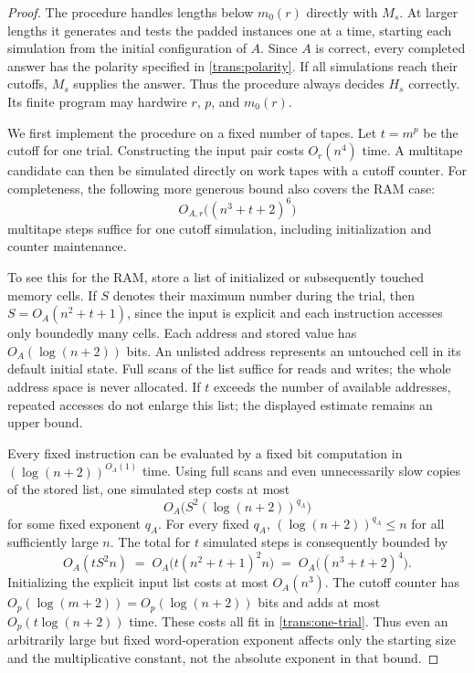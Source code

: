 \begin{proof}
The procedure handles lengths below $m_0(r)$ directly with $M_s$. At larger
lengths it generates and tests the padded instances one at a time, starting
each simulation from the initial configuration of $A$. Since $A$ is correct,
every completed answer has the polarity specified in
\eqref{trans:polarity}. If all simulations reach their cutoffs, $M_s$
supplies the answer. Thus the procedure always decides $H_s$ correctly.
Its finite program may hardwire $r$, $p$, and $m_0(r)$.

We first implement the procedure on a fixed number of tapes. Let $t=m^p$
be the cutoff for one trial. Constructing the input pair costs $O_r(n^4)$
time. A multitape candidate can then be simulated directly on work tapes
with a cutoff counter. For completeness, the following more generous
bound also covers the RAM case:
\begin{equation}
\label{trans:one-trial}
  O_{A,r}\bigl((n^3+t+2)^6\bigr)
\end{equation}
multitape steps suffice for one cutoff simulation, including initialization
and counter maintenance.

To see this for the RAM, store a list of initialized or subsequently
touched memory cells. If $S$ denotes their maximum number during the trial,
then
$S=O_A(n^2+t+1)$, since the input is explicit and each instruction accesses
only boundedly many cells.
Each address and stored value has $O_A(\log(n+2))$ bits. An unlisted address
represents an untouched cell in its default initial state. Full scans of
the list suffice for reads and writes; the whole address space is never
allocated. If $t$ exceeds the number of available addresses, repeated
accesses do not enlarge this list; the displayed estimate remains an
upper bound.

Every fixed instruction can be evaluated by a fixed bit computation in
$(\log(n+2))^{O_A(1)}$ time. Using full scans and even unnecessarily slow
copies of the stored list, one simulated step costs at most
\[
  O_A\bigl(S^2(\log(n+2))^{q_A}\bigr)
\]
for some fixed exponent $q_A$. For every fixed $q_A$,
$(\log(n+2))^{q_A}\le n$ for all sufficiently large $n$. The total for
$t$ simulated steps is consequently bounded by
\[
  O_A(tS^2n)
  \;=\;O_A\bigl(t(n^2+t+1)^2n\bigr)
  \;=\;O_A\bigl((n^3+t+2)^4\bigr).
\]
Initializing the explicit input list costs at most $O_A(n^3)$. The cutoff
counter has $O_p(\log(m+2))=O_p(\log(n+2))$ bits and adds at most
$O_p(t\log(n+2))$ time. These costs all fit in
\eqref{trans:one-trial}. Thus even an arbitrarily large but fixed
word-operation exponent affects only the starting size and the
multiplicative constant, not the absolute exponent in that bound.


\end{proof}
